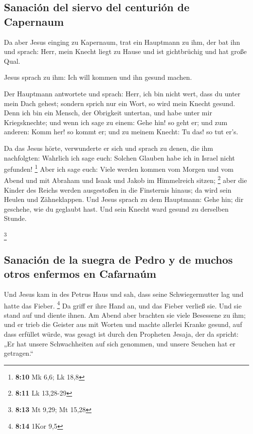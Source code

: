 \hypertarget{sanaciuxf3n-del-siervo-del-centuriuxf3n-de-capernaum}{%
\subsection{Sanación del siervo del centurión de
Capernaum}\label{sanaciuxf3n-del-siervo-del-centuriuxf3n-de-capernaum}}

 Da aber Jesus einging zu Kapernaum, trat ein Hauptmann zu
ihm, der bat ihn  und sprach: Herr, mein Knecht liegt zu
Hause und ist gichtbrüchig und hat große Qual.

 Jesus sprach zu ihm: Ich will kommen und ihn gesund
machen.

 Der Hauptmann antwortete und sprach: Herr, ich bin nicht
wert, dass du unter mein Dach gehest; sondern sprich nur ein Wort, so
wird mein Knecht gesund.  Denn ich bin ein Mensch, der
Obrigkeit untertan, und habe unter mir Kriegsknechte; und wenn ich sage
zu einem: Gehe hin! so geht er; und zum anderen: Komm her! so kommt er;
und zu meinem Knecht: Tu das! so tut er's.

 Da das Jesus hörte, verwunderte er sich und sprach zu
denen, die ihm nachfolgten: Wahrlich ich sage euch: Solchen Glauben habe
ich in Israel nicht gefunden! \footnote{\textbf{8:10} Mk 6,6; Lk 18,8}
 Aber ich sage euch: Viele werden kommen vom Morgen und
vom Abend und mit Abraham und Isaak und Jakob im Himmelreich sitzen;
\footnote{\textbf{8:11} Lk 13,28-29}  aber die Kinder des
Reichs werden ausgestoßen in die Finsternis hinaus; da wird sein Heulen
und Zähneklappen.  Und Jesus sprach zu dem Hauptmann:
Gehe hin; dir geschehe, wie du geglaubt hast. Und sein Knecht ward
gesund zu derselben Stunde.

\footnote{\textbf{8:13} Mt 9,29; Mt 15,28}

\hypertarget{sanaciuxf3n-de-la-suegra-de-pedro-y-de-muchos-otros-enfermos-en-cafarnauxfam}{%
\subsection{Sanación de la suegra de Pedro y de muchos otros enfermos en
Cafarnaúm}\label{sanaciuxf3n-de-la-suegra-de-pedro-y-de-muchos-otros-enfermos-en-cafarnauxfam}}

 Und Jesus kam in des Petrus Haus und sah, dass seine
Schwiegermutter lag und hatte das Fieber. \footnote{\textbf{8:14} 1Kor
  9,5}  Da griff er ihre Hand an, und das Fieber verließ
sie. Und sie stand auf und diente ihnen.  Am Abend aber
brachten sie viele Besessene zu ihm; und er trieb die Geister aus mit
Worten und machte allerlei Kranke gesund,  auf dass
erfüllet würde, was gesagt ist durch den Propheten Jesaja, der da
spricht: „Er hat unsere Schwachheiten auf sich genommen, und unsere
Seuchen hat er getragen.``

